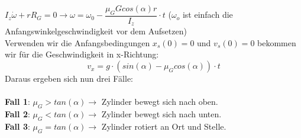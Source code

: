\documentclass[12pt]{article}
\begin{document}
$I_z \dot{\omega} + rR_G = 0 \rightarrow \omega = \omega_0 - \dfrac{\mu_G G cos(\alpha)r}{I_z} \cdot t$ ($\omega_o$ ist einfach die Anfangswinkelgeschwindigkeit vor dem Aufsetzen)\\
Verwenden wir die Anfangsbedingungen $x_s(0) = 0$ und $v_s(0) = 0$ bekommen wir für die Geschwindigkeit in x-Richtung:
\begin{equation}
v_x = g\cdot (sin(\alpha) - \mu_G cos(\alpha)) \cdot t
\end{equation}
Daraus ergeben sich nun drei Fälle:\\
\\
\textbf{Fall 1}: $\mu_G > tan(\alpha) \rightarrow$ Zylinder bewegt sich nach oben.\\
\textbf{Fall 2}: $\mu_G < tan(\alpha) \rightarrow$ Zylinder bewegt sich nach unten.\\
\textbf{Fall 3}: $\mu_G = tan(\alpha) \rightarrow$ Zylinder rotiert an Ort und Stelle.
\end{document}
